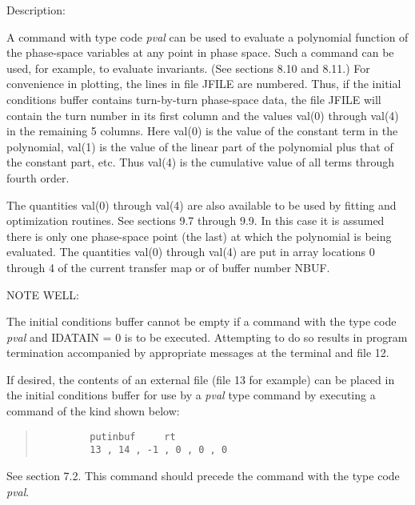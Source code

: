\vspace{5mm}
     Description:
\vspace{2mm}

A command with type code {\em pval} can be used to evaluate a polynomial function of the phase-space variables at any point in phase space.  Such a command can be used, for example, to evaluate invariants.  (See sections 8.10 and 8.11.)  For convenience in plotting, the lines in file JFILE are numbered.  Thus, if the initial conditions buffer contains turn-by-turn phase-space data, the file JFILE will contain the turn number in its first column and the values val(0) through val(4) in the remaining 5 columns.  Here val(0) is the value of the constant term in the polynomial, val(1) is the value of the linear part of the polynomial plus that of the constant part, etc.  Thus val(4) is the cumulative value of all terms through fourth order.

The quantities val(0) through val(4) are also available to be used by fitting and optimization routines.  See sections 9.7 through 9.9.  In this case it is assumed there is only one phase-space point (the last) at which the polynomial is being evaluated.  The quantities val(0) through val(4) are put in array locations 0 through 4 of the current transfer map or of buffer number NBUF.

\vspace{5mm}
NOTE WELL:
\vspace{2mm}

     The initial conditions buffer cannot be empty if a command with the
type code {\em pval } and IDATAIN = 0 is to be executed.  Attempting to do so
results in \Mary program termination accompanied by appropriate messages
at the terminal and file 12.

     If desired, the contents of an external file (file 13 for example) can
be placed in the initial conditions buffer for use by a {\em pval } type command
by executing a command of the kind shown below:
\begin{quotation}
\begin{verbatim}
         putinbuf     rt
         13 , 14 , -1 , 0 , 0 , 0
\end{verbatim}
\end{quotation}
See section 7.2.  This command should precede the command with the type
code {\em pval}.

\newpage
